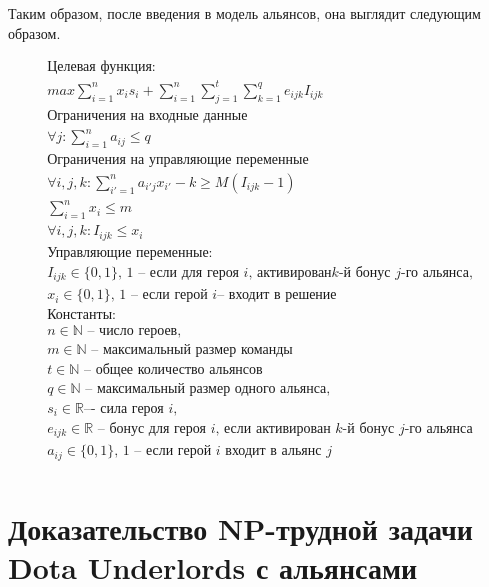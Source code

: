 \documentclass{article}
\begin{document}
Таким образом, после введения в модель альянсов, она выглядит следующим образом.

\begin{equation}
\begin{gathered}
\textbf{Целевая функция:}\\
max \sum_{i=1}^{n} x_i s_i + \sum_{i=1}^{n} \sum_{j=1}^{t}  \sum_{k=1}^{q} e_{ijk} I_{ijk} \\
\textbf{Ограничения на входные данные}\\
\forall{j} : \sum_{i=1}^n a_{ij} \le q \\
\textbf{Ограничения на управляющие переменные} \\
\forall{i,j,k} :  \sum_{i'=1}^{n} a_{i'j} x_{i'} - k \ge M( I_{ijk}  - 1) \\
\sum_{i=1}^n x_i \le m   \\ 
\forall{i,j,k} :  I_{ijk}  \le x_i \\
\text{Управляющие переменные:} \\
I_{ijk} \in \{0, 1\} \text {, 1 – если для героя } i \text{, активирован} k\text{-й бонус } j \text{-го альянса,} \\
x_i  \in \{0, 1\} \text{, 1 -- если герой } i \text{– входит в решение} \\
\textbf{Константы:} \\
n \in \mathbb{N} \text{ -- число героев,} \\
m \in \mathbb{N} \text{ -- максимальный размер команды}\\
t \in \mathbb{N} \text{ -- общее количество альянсов} \\
q \in \mathbb{N} \text{ -- максимальный размер одного альянса,} \\
s_i  \in \mathbb{R} \text{–- сила героя } i, \\
e_{ijk} \in \mathbb{R} \text{ -- бонус для героя } i \text{,  если активирован } k
\text{-й бонус } j \text{-го альянса} \\
a_{ij} \in \{0, 1\} \text{, 1 -- если герой } i \text{ входит в альянс } j \\ 
\end{gathered}
\end{equation}

\section{Доказательство NP-трудной задачи Dota Underlords с альянсами}
\end{document}
